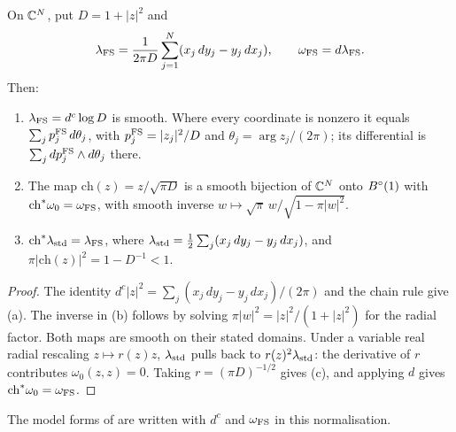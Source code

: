 \begin{lemma}\label{lem:pre-fs}
On $\mathbb{C}^N$, put $D=1+|z|^2$ and
\[
 \lambda_{\rm FS}=
 \frac{1}{2\pi D}\sum_{j=1}^N(x_j\,dy_j-y_j\,dx_j),\qquad
 \omega_{\rm FS}=d\lambda_{\rm FS}.
\]
Then:
\begin{enumerate}[label=(\alph*)]
\item $\lambda_{\rm FS}=d^c\log D$ is smooth. Where every coordinate is nonzero it equals
 $\sum_j p_j^{\rm FS}\,d\theta_j$, with $p_j^{\rm FS}=|z_j|^2/D$ and
 $\theta_j=\arg z_j/(2\pi)$; its differential is $\sum_jdp_j^{\rm FS}\wedge d\theta_j$ there.
\item The map $\mathrm{ch}(z)=z/\sqrt{\pi D}$ is a smooth bijection of $\mathbb{C}^N$ onto $B^{\circ}(1)$ with $\mathrm{ch}^*\omega_0=\omega_{\rm FS}$,
 with smooth inverse $w\mapsto\sqrt\pi\,w/\sqrt{1-\pi|w|^2}$.
\item $\mathrm{ch}^*\lambda_{\rm std}=\lambda_{\rm FS}$, where
 $\lambda_{\rm std}=\frac12\sum_j(x_j\,dy_j-y_j\,dx_j)$, and
 $\pi|\mathrm{ch}(z)|^2=1-D^{-1}<1$.
\end{enumerate}
\end{lemma}

\begin{proof}
The identity $d^c|z|^2=\sum_j(x_j\,dy_j-y_j\,dx_j)/(2\pi)$ and the chain rule give (a).
The inverse in (b) follows by solving $\pi|w|^2=|z|^2/(1+|z|^2)$ for the radial factor.
Both maps are smooth on their stated domains. Under a variable real radial rescaling $z\mapsto r(z)z$,
$\lambda_{\rm std}$ pulls back to $r(z)^2\lambda_{\rm std}$: the derivative of $r$ contributes
$\omega_0(z,z)=0$. Taking $r=(\pi D)^{-1/2}$ gives (c), and applying $d$ gives $\mathrm{ch}^*\omega_0=\omega_{\rm FS}$.
\end{proof}

The model forms of  are written with $d^c$ and $\omega_{\rm FS}$ in this
normalisation.

